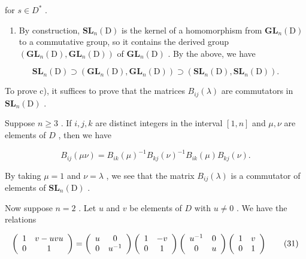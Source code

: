 for \(s \in D^{*}\) .

\begin{enumerate}
\def\labelenumi{\Alph{enumi})}
\setcounter{enumi}{1}
\tightlist
\item
  By construction, \(\mathbf{SL}_{n}(\mathrm{D})\) is the kernel of a homomorphism from \(\mathbf{GL}_{n}(\mathrm{D})\) to a commutative group, so it contains the derived group \((\mathbf{GL}_{n}(\mathrm{D}),\mathbf{GL}_{n}(\mathrm{D}))\) of \(\mathbf{GL}_{n}(\mathrm{D})\) . By the above, we have
\end{enumerate}

\[
\mathbf {S L} _ {n} (\mathrm{D}) \supset (\mathbf {G L} _ {n} (\mathrm{D}), \mathbf {G L} _ {n} (\mathrm{D})) \supset (\mathbf {S L} _ {n} (\mathrm{D}), \mathbf {S L} _ {n} (\mathrm{D})).
\]

To prove c), it suffices to prove that the matrices \(B_{ij}(\lambda)\) are commutators in \(\mathbf{SL}_n(\mathrm{D})\) .

Suppose \(n \geqslant 3\) . If \(i, j, k\) are distinct integers in the interval \([1, n]\) and \(\mu, \nu\) are elements of \(D\) , then we have

\[
B _ {i j} (\mu \nu) = B _ {i k} (\mu) ^ {- 1} B _ {k j} (\nu) ^ {- 1} B _ {i k} (\mu) B _ {k j} (\nu).\tag{30}
\]

By taking \(\mu = 1\) and \(\nu = \lambda\) , we see that the matrix \(B_{ij}(\lambda)\) is a commutator of elements of \(\mathbf{SL}_n(\mathrm{D})\) .

Now suppose \(n = 2\) . Let \(u\) and \(v\) be elements of \(D\) with \(u \neq 0\) . We have the relations

\[
\left( \begin{array}{c c} 1 & v - u v u \\ 0 & 1 \end{array} \right) = \left( \begin{array}{c c} u & 0 \\ 0 & u ^ {- 1} \end{array} \right) \left( \begin{array}{c c} 1 & - v \\ 0 & 1 \end{array} \right) \left( \begin{array}{c c} u ^ {- 1} & 0 \\ 0 & u \end{array} \right) \left( \begin{array}{c c} 1 & v \\ 0 & 1 \end{array} \right)\tag{31}
\]

